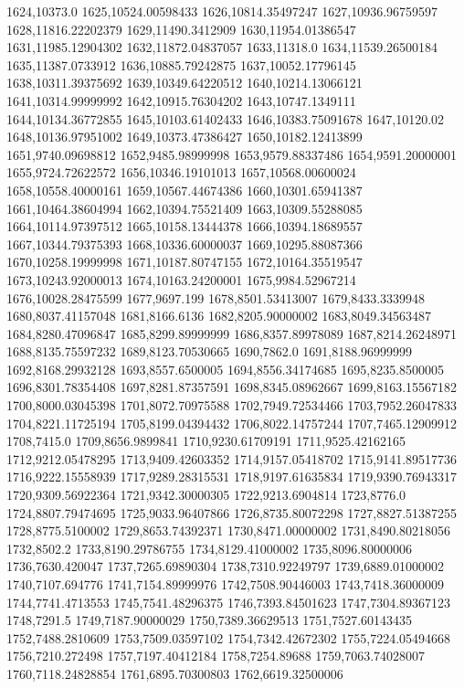 1624,10373.0
1625,10524.00598433
1626,10814.35497247
1627,10936.96759597
1628,11816.22202379
1629,11490.3412909
1630,11954.01386547
1631,11985.12904302
1632,11872.04837057
1633,11318.0
1634,11539.26500184
1635,11387.0733912
1636,10885.79242875
1637,10052.17796145
1638,10311.39375692
1639,10349.64220512
1640,10214.13066121
1641,10314.99999992
1642,10915.76304202
1643,10747.1349111
1644,10134.36772855
1645,10103.61402433
1646,10383.75091678
1647,10120.02
1648,10136.97951002
1649,10373.47386427
1650,10182.12413899
1651,9740.09698812
1652,9485.98999998
1653,9579.88337486
1654,9591.20000001
1655,9724.72622572
1656,10346.19101013
1657,10568.00600024
1658,10558.40000161
1659,10567.44674386
1660,10301.65941387
1661,10464.38604994
1662,10394.75521409
1663,10309.55288085
1664,10114.97397512
1665,10158.13444378
1666,10394.18689557
1667,10344.79375393
1668,10336.60000037
1669,10295.88087366
1670,10258.19999998
1671,10187.80747155
1672,10164.35519547
1673,10243.92000013
1674,10163.24200001
1675,9984.52967214
1676,10028.28475599
1677,9697.199
1678,8501.53413007
1679,8433.3339948
1680,8037.41157048
1681,8166.6136
1682,8205.90000002
1683,8049.34563487
1684,8280.47096847
1685,8299.89999999
1686,8357.89978089
1687,8214.26248971
1688,8135.75597232
1689,8123.70530665
1690,7862.0
1691,8188.96999999
1692,8168.29932128
1693,8557.6500005
1694,8556.34174685
1695,8235.8500005
1696,8301.78354408
1697,8281.87357591
1698,8345.08962667
1699,8163.15567182
1700,8000.03045398
1701,8072.70975588
1702,7949.72534466
1703,7952.26047833
1704,8221.11725194
1705,8199.04394432
1706,8022.14757244
1707,7465.12909912
1708,7415.0
1709,8656.9899841
1710,9230.61709191
1711,9525.42162165
1712,9212.05478295
1713,9409.42603352
1714,9157.05418702
1715,9141.89517736
1716,9222.15558939
1717,9289.28315531
1718,9197.61635834
1719,9390.76943317
1720,9309.56922364
1721,9342.30000305
1722,9213.6904814
1723,8776.0
1724,8807.79474695
1725,9033.96407866
1726,8735.80072298
1727,8827.51387255
1728,8775.5100002
1729,8653.74392371
1730,8471.00000002
1731,8490.80218056
1732,8502.2
1733,8190.29786755
1734,8129.41000002
1735,8096.80000006
1736,7630.420047
1737,7265.69890304
1738,7310.92249797
1739,6889.01000002
1740,7107.694776
1741,7154.89999976
1742,7508.90446003
1743,7418.36000009
1744,7741.4713553
1745,7541.48296375
1746,7393.84501623
1747,7304.89367123
1748,7291.5
1749,7187.90000029
1750,7389.36629513
1751,7527.60143435
1752,7488.2810609
1753,7509.03597102
1754,7342.42672302
1755,7224.05494668
1756,7210.272498
1757,7197.40412184
1758,7254.89688
1759,7063.74028007
1760,7118.24828854
1761,6895.70300803
1762,6619.32500006
